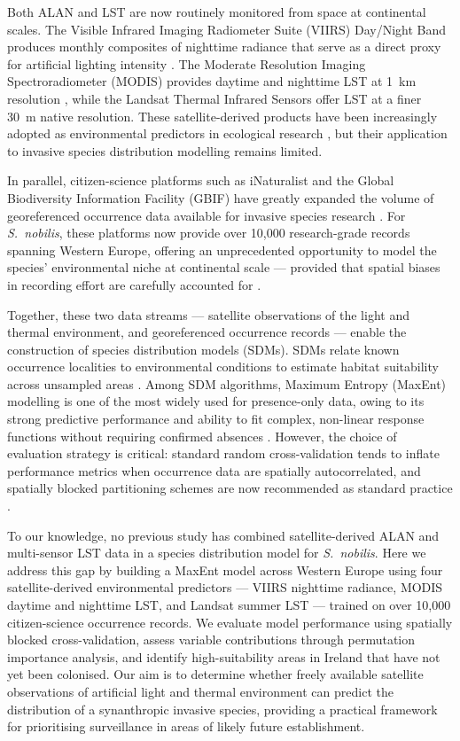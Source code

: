 \documentclass[11pt, a4paper, twocolumn]{article}
\begin{document}
Both ALAN and LST are now routinely monitored from space at continental scales. The Visible Infrared Imaging Radiometer Suite (VIIRS) Day/Night Band produces monthly composites of nighttime radiance that serve as a direct proxy for artificial lighting intensity \citep{Elvidge2017, Falchi2016}. The Moderate Resolution Imaging Spectroradiometer (MODIS) provides daytime and nighttime LST at 1~km resolution \citep{Wan2014}, while the Landsat Thermal Infrared Sensors offer LST at a finer 30~m native resolution. These satellite-derived products have been increasingly adopted as environmental predictors in ecological research \citep{Pettorelli2014, Waltari2014}, but their application to invasive species distribution modelling remains limited.

In parallel, citizen-science platforms such as iNaturalist and the Global Biodiversity Information Facility (GBIF) have greatly expanded the volume of georeferenced occurrence data available for invasive species research \citep{Feldman2021}. For \textit{S.~nobilis}, these platforms now provide over 10,000 research-grade records spanning Western Europe, offering an unprecedented opportunity to model the species' environmental niche at continental scale --- provided that spatial biases in recording effort are carefully accounted for \citep{Beck2014}.

Together, these two data streams --- satellite observations of the light and thermal environment, and georeferenced occurrence records --- enable the construction of species distribution models (SDMs). SDMs relate known occurrence localities to environmental conditions to estimate habitat suitability across unsampled areas \citep{Elith2006}. Among SDM algorithms, Maximum Entropy (MaxEnt) modelling is one of the most widely used for presence-only data, owing to its strong predictive performance and ability to fit complex, non-linear response functions without requiring confirmed absences \citep{Phillips2006, Phillips2008, Elith2011, Merow2013}. However, the choice of evaluation strategy is critical: standard random cross-validation tends to inflate performance metrics when occurrence data are spatially autocorrelated, and spatially blocked partitioning schemes are now recommended as standard practice \citep{Roberts2017, Valavi2019}.

To our knowledge, no previous study has combined satellite-derived ALAN and multi-sensor LST data in a species distribution model for \textit{S.~nobilis}. Here we address this gap by building a MaxEnt model across Western Europe using four satellite-derived environmental predictors --- VIIRS nighttime radiance, MODIS daytime and nighttime LST, and Landsat summer LST --- trained on over 10,000 citizen-science occurrence records. We evaluate model performance using spatially blocked cross-validation, assess variable contributions through permutation importance analysis, and identify high-suitability areas in Ireland that have not yet been colonised. Our aim is to determine whether freely available satellite observations of artificial light and thermal environment can predict the distribution of a synanthropic invasive species, providing a practical framework for prioritising surveillance in areas of likely future establishment.
\end{document}
